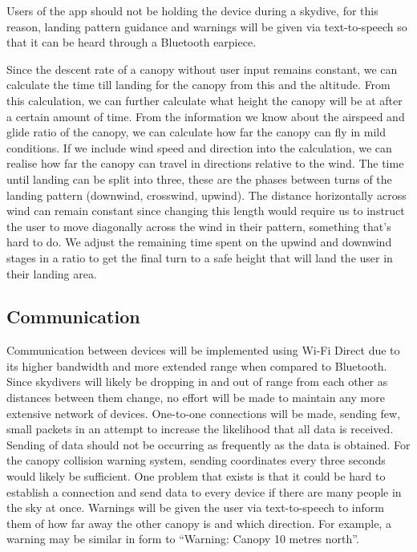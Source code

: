\documentclass[11pt, a4paper, twocolumn]{article}
\begin{document}
Users of the app should not be holding the device during a skydive, for this reason, landing pattern guidance and warnings will be given via text-to-speech so that it can be heard through a Bluetooth earpiece.

Since the descent rate of a canopy without user input remains constant, we can calculate the time till landing for the canopy from this and the altitude. From this calculation, we can further calculate what height the canopy will be at after a certain amount of time.
From the information we know about the airspeed and glide ratio of the canopy, we can calculate how far the canopy can fly in mild conditions. If we include wind speed and direction into the calculation, we can realise how far the canopy can travel in directions relative to the wind.
The time until landing can be split into three, these are the phases between turns of the landing pattern (downwind, crosswind, upwind). The distance horizontally across wind can remain constant since changing this length would require us to instruct the user to move diagonally across the wind in their pattern, something that's hard to do. We adjust the remaining time spent on the upwind and downwind stages in a ratio to get the final turn to a safe height that will land the user in their landing area.

\subsection{Communication} %
Communication between devices will be implemented using Wi-Fi Direct due to its higher bandwidth and more extended range when compared to Bluetooth. Since skydivers will likely be dropping in and out of range from each other as distances between them change, no effort will be made to maintain any more extensive network of devices. One-to-one connections will be made, sending few, small packets in an attempt to increase the likelihood that all data is received. Sending of data should not be occurring as frequently as the data is obtained. For the canopy collision warning system, sending coordinates every three seconds would likely be sufficient. One problem that exists is that it could be hard to establish a connection and send data to every device if there are many people in the sky at once.
Warnings will be given the user via text-to-speech to inform them of how far away the other canopy is and which direction. For example, a warning may be similar in form to ``Warning: Canopy 10 metres north''.
\end{document}
